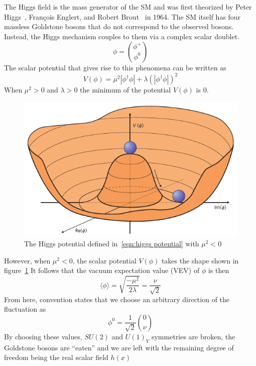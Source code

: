 		The Higgs field is the mass generator of the SM and was first theorized by Peter Higgs~\cite{Higgs-paper}, François Englert, and Robert Brout~\cite{Englert-Brout} in 1964.  The SM itself has four massless Goldstone bosons that do not correspond to the observed bosons. Instead, the Higgs mechanism couples to them via a complex scalar doublet. 
		\begin{equation}\label{eqn:scal doub} \phi = \binom{\phi^+}{\phi^0}\end{equation}
		The scalar potential that gives rise to this phenomena can be written as 
		\begin{equation}\label{eqn:higgs potential} V(\phi) = \mu^2 |\phi^{\dagger}\phi| + \lambda (|\phi^{\dagger}\phi|)^2\end{equation}
		When $\mu^2>0$ and $\lambda>0$ the minimum of the potential $V(\phi)$ is 0. 
		\begin{figure}[!ht] \centering \includegraphics[width=.7\textwidth,keepaspectratio=true]{chapters/chapter1_theory/images/higgspotential.png} \caption{The Higgs potential defined in~\ref{eqn:higgs potential} with $\mu^2<0$ ~\cite{Higgs-phys}} \label{fig:higgs-potential}\end{figure}
		However, when $\mu^2<0$, the scalar potential $V(\phi)$ takes the shape shown in figure~\ref{fig:higgs-potential}
		It follows that the vacuum expectation value (VEV) of $\phi$ is then 
		\begin{equation}\label{eqn:higgs vev} \langle \phi \rangle = \sqrt{\frac{-\mu^2}{2\lambda}} = \frac{\nu}{\sqrt{2}}	\end{equation}
		From here, convention states that we choose an arbitrary direction of the fluctuation as 
		\begin{equation}\label{eqn:phi zero} \phi^0 = \frac{1}{\sqrt{2}} \binom{0}{\nu} \end{equation}
		By choosing these values, $SU(2)$ and $U(1)_Y$ symmetries are broken, the Goldstone bosons are ``eaten'' and we are left with the remaining degree of freedom being the real scalar field $h(x)$
